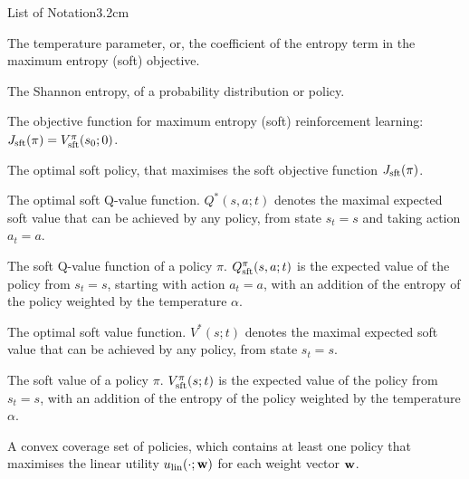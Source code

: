 \begin{mclistof}{List of Notation}{3.2cm}
    \\
    \item[{\parbox[t]{\textwidth}{
        \Large\textbf{Maximum Entropy Reinforcement Learning \\(Section \ref{sec:2-3-1-merl})}\hfill\hfill
      }}]
    \item[$\alpha$] 
        The temperature parameter, or, the coefficient of the entropy term in the maximum entropy (soft) objective.
    \item[$\cl{H}$]
        The Shannon entropy, of a probability distribution or policy.
    \item[$J_{\sft}(\pi)$] 
        The objective function for maximum entropy (soft) reinforcement learning: $J_{{\textnormal{sft}}}(\pi) = V_{{\textnormal{sft}}}^{\pi}(s_0;0)$.
    \item[$\pi_{\sft}^*$]
        The optimal soft policy, that maximises the soft objective function $J_{\sft}(\pi)$.
    \item[$Q_{\sft}^*$]
        The optimal soft Q-value function. $Q^*(s,a;t)$ denotes the maximal expected soft value that can be achieved by any policy, from state $s_t=s$ and taking action $a_t=a$. 
    \item[$Q_{\sft}^{\pi}$]
        The soft Q-value function of a policy $\pi$. $Q_{{\textnormal{sft}}}^{\pi}(s,a;t)$ is the expected value of the policy from $s_t=s$, starting with action $a_t=a$, with an addition of the entropy of the policy weighted by the temperature $\alpha$.
    \item[$V_{\sft}^*$]
        The optimal soft value function. $V^*(s;t)$ denotes the maximal expected soft value that can be achieved by any policy, from state $s_t=s$. 
    \item[$V_{\sft}^{\pi}$]
        The soft value of a policy $\pi$. $V_{{\textnormal{sft}}}^{\pi}(s;t)$ is the expected value of the policy from $s_t=s$, with an addition of the entropy of the policy weighted by the temperature $\alpha$.
    \\
    \item[{\parbox[t]{\textwidth}{
        \Large\textbf{Multi-Objective Reinforcement Learning \\(Section \ref{sec:2-5-morl})}\hfill\hfill
      }}]
    \item[$CCS(\Pi)$] 
        A convex coverage set of policies, which contains at least one policy that maximises the linear utility $u_{{\textnormal{lin}}}(\cdot;\mathbf{w})$ for each weight vector $\mathbf{w}$.
    \item[$CCS_{\min}(\Pi)$]

\end{mclistof}
